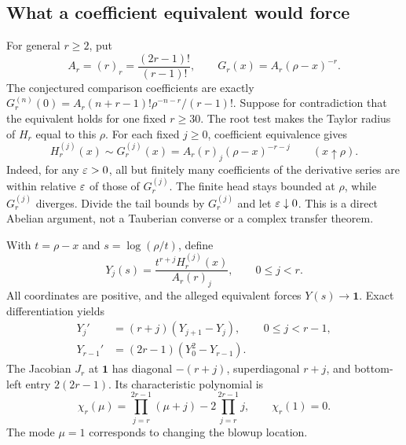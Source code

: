 \subsection{What a coefficient equivalent would force}
For general $r\ge2$, put
\begin{equation}\label{his:eq:Ar}
 A_r=(r)_r=\frac{(2r-1)!}{(r-1)!},\qquad
 G_r(x)=A_r(\rho-x)^{-r}.
\end{equation}
The conjectured comparison coefficients are exactly
$G_r^{(n)}(0)=A_r(n+r-1)!\rho^{-n-r}/(r-1)!$. Suppose for contradiction that the equivalent holds for one fixed $r\ge30$. The root test makes the Taylor radius of $H_r$ equal to this $\rho$. For each fixed $j\ge0$, coefficient equivalence gives
\[
 H_r^{(j)}(x)\sim G_r^{(j)}(x)=A_r(r)_j(\rho-x)^{-r-j}
 \qquad(x\uparrow\rho).
\]
Indeed, for any $\varepsilon>0$, all but finitely many coefficients of the derivative series are within relative $\varepsilon$ of those of $G_r^{(j)}$. The finite head stays bounded at $\rho$, while $G_r^{(j)}$ diverges. Divide the tail bounds by $G_r^{(j)}$ and let $\varepsilon\downarrow0$. This is a direct Abelian argument, not a Tauberian converse or a complex transfer theorem.

With $t=\rho-x$ and $s=\log(\rho/t)$, define
\begin{equation}\label{his:eq:Yr}
 Y_j(s)=\frac{t^{r+j}H_r^{(j)}(x)}{A_r(r)_j},\qquad 0\le j<r.
\end{equation}
All coordinates are positive, and the alleged equivalent forces $Y(s)\to\mathbf1$. Exact differentiation yields
\begin{align}
 Y_j'&=(r+j)(Y_{j+1}-Y_j),&&0\le j<r-1,\label{his:eq:Ysystem}\\
 Y_{r-1}'&=(2r-1)(Y_0^2-Y_{r-1}).\nonumber
\end{align}
The Jacobian $J_r$ at $\mathbf1$ has diagonal $-(r+j)$, superdiagonal $r+j$, and bottom-left entry $2(2r-1)$. Its characteristic polynomial is
\begin{equation}\label{his:eq:chi}
 \chi_r(\mu)=\prod_{j=r}^{2r-1}(\mu+j)-2\prod_{j=r}^{2r-1}j,
 \qquad \chi_r(1)=0.
\end{equation}
The mode $\mu=1$ corresponds to changing the blowup location.


